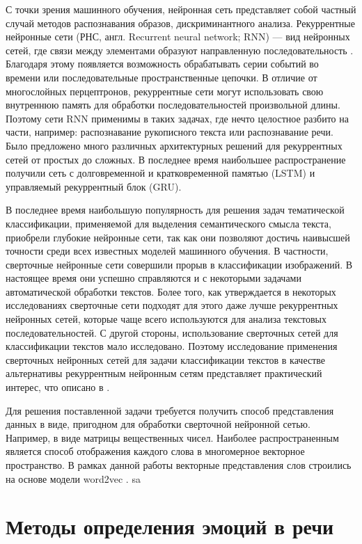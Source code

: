 С точки зрения машинного обучения, нейронная сеть представляет собой частный случай методов распознавания образов, дискриминантного анализа.
Рекуррентные нейронные сети (РНС, англ. Recurrent neural network; RNN) — вид нейронных сетей, где связи между элементами образуют 
направленную последовательность \cite{Wikipedia01}. Благодаря этому появляется возможность обрабатывать серии событий во времени или последовательные 
пространственные цепочки. В отличие от многослойных перцептронов, рекуррентные сети могут использовать свою внутреннюю память для 
обработки последовательностей произвольной длины. Поэтому сети RNN применимы в таких задачах, где нечто целостное разбито на части, 
например: распознавание рукописного текста или распознавание речи. Было предложено много различных архитектурных решений для 
рекуррентных сетей от простых до сложных. В последнее время наибольшее распространение получили сеть с долговременной и 
кратковременной памятью (LSTM) и управляемый рекуррентный блок (GRU).

В последнее время наибольшую популярность для решения задач тематической классификации, применяемой для выделения семантического смысла текста,
приобрели глубокие нейронные сети, так как они позволяют достичь наивысшей точности среди всех известных моделей машинного обучения. 
В частности, сверточные нейронные сети совершили прорыв в классификации изображений. В настоящее время они успешно справляются и с 
некоторыми задачами автоматической обработки текстов. Более того, как утверждается в некоторых исследованиях сверточные сети подходят 
для этого даже лучше рекуррентных нейронных сетей, которые чаще всего используются для анализа текстовых последовательностей. 
С другой стороны, использование сверточных сетей для классификации текстов мало исследовано. Поэтому исследование применения 
сверточных нейронных сетей для задачи классификации текстов в качестве альтернативы рекуррентным нейронным сетям представляет 
практический интерес, что описано в \cite{neural10}.

Для решения поставленной задачи требуется получить способ представления данных в виде, пригодном для обработки сверточной нейронной сетью. 
Например, в виде матрицы вещественных чисел. Наиболее распространенным является способ отображения каждого слова в многомерное 
векторное пространство. В рамках данной работы векторные представления слов строились на основе модели word2vec \cite{cyberlinka01}.
sa

\section{Методы определения эмоций в речи}


